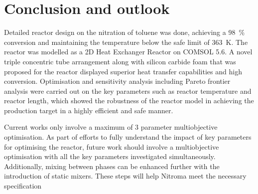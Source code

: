 \section{Conclusion and outlook} \label{sec:conclusion}
Detailed reactor design on the nitration of toluene was done, achieving a \SI{98}{\%} conversion and maintaining the temperature below the safe limit of \SI{363}{\K}. The reactor was modelled as a 2D Heat Exchanger Reactor on COMSOL 5.6. A novel triple concentric tube arrangement along with silicon carbide foam that was proposed for the reactor displayed superior heat transfer capabilities and high conversion. Optimisation and sensitivity analysis including Pareto frontier analysis were carried out on the key parameters such as reactor temperature and reactor length, which showed the robustness of the reactor model in achieving the production target in a highly efficient and safe manner. 

Current works only involve a maximum of 3 parameter multiobjective optimisation. As part of efforts to fully understand the impact of key parameters for optimising the reactor, future work should involve a multiobjective optimisation with all the key parameters investigated simultaneously. Additionally, mixing between phases can be enhanced further with the introduction of static mixers. These steps will help Nitroma meet the necessary specification 


